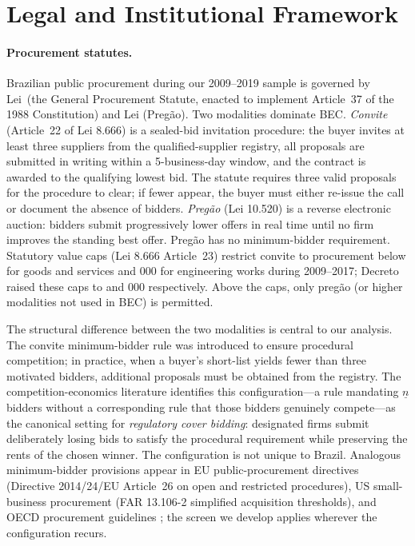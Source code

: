 \section{Legal and Institutional Framework}
\label{sec:institutional}

\paragraph{Procurement statutes.}
Brazilian public procurement during our 2009--2019 sample is
governed by Lei~\valLeiOriginal (the General Procurement Statute,
enacted to implement Article~37 of the 1988 Constitution) and
Lei \valLeiPregao (Pregão). Two modalities dominate BEC.
\emph{Convite} (Article~22 of Lei 8.666) is a sealed-bid
invitation procedure: the buyer invites at least three suppliers
from the qualified-supplier registry, all proposals are
submitted in writing within a 5-business-day window, and the
contract is awarded to the qualifying lowest bid. The statute
requires three valid proposals for the procedure to clear; if
fewer appear, the buyer must either re-issue the call or
document the absence of bidders. \emph{Pregão} (Lei 10.520) is
a reverse electronic auction: bidders submit progressively lower
offers in real time until no firm improves the standing best
offer. Pregão has no minimum-bidder requirement. Statutory value
caps (Lei 8.666 Article~23) restrict convite to procurement
below \valCapOldR for goods and services and \valCapMidR{,}000 for
engineering works during 2009--2017; Decreto \valDecreto raised
these caps to \valCapNewR and \valCapHighR{,}000 respectively. Above
the caps, only pregão (or higher modalities not used in BEC) is
permitted.

The structural difference between the two modalities is central
to our analysis. The convite minimum-bidder rule was introduced
to ensure procedural competition; in practice, when a buyer's
short-list yields fewer than three motivated bidders, additional
proposals must be obtained from the registry. The competition-economics
literature
\citep{marshall2012economics, asker2010leniency,
porter1993detection} identifies this configuration---a rule
mandating $\underline{n}$ bidders without a corresponding rule
that those bidders genuinely compete---as the canonical setting
for \emph{regulatory cover bidding}: designated firms submit
deliberately losing bids to satisfy the procedural requirement
while preserving the rents of the chosen winner. The
configuration is not unique to Brazil. Analogous minimum-bidder
provisions appear in EU public-procurement directives (Directive
2014/24/EU Article~26 on open and restricted procedures),
US small-business procurement (FAR 13.106-2 simplified
acquisition thresholds), and OECD procurement guidelines
\citep{oecd2019government}; the screen we develop applies
wherever the configuration recurs.

